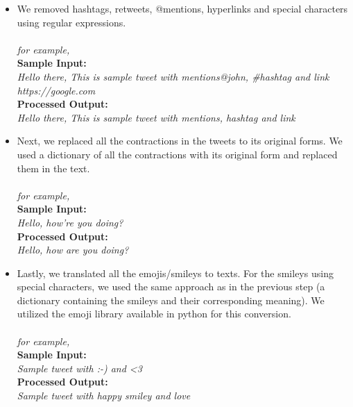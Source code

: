 \documentclass[a4paper,10pt]{article}
\begin{document}
    \begin{itemize}
        \item{
            We removed hashtags, retweets, @mentions, hyperlinks and special characters using regular expressions.
            \\ \\
            \textit{for example, \\  }
            {\textbf{Sample Input: \\} \textit{ Hello there, This is sample tweet with mentions@john, \#hashtag and link https://google.com} \\ }
            {\textbf{Processed Output: \\}\textit{  Hello there, This is sample tweet with mentions, hashtag and link \\ } }
        }
        \item{
            Next, we replaced all the contractions in the tweets to its original forms. We used a dictionary of all the contractions with its original form and replaced them in the text.
            \\ \\
            \textit{for example, \\  }
            {\textbf{Sample Input: \\} \textit{Hello, how're you doing?} \\ }
            {\textbf{Processed Output: \\}\textit{   Hello, how are you doing? \\ } }
        }
        \item{
            Lastly, we translated all the emojis/smileys to texts. For the smileys using special characters, we used the same approach as in the previous step (a dictionary containing the smileys and their corresponding meaning). We utilized the emoji library available in python for this conversion.
            \\ \\
            \textit{for example, \\  }
            {\textbf{Sample Input: \\} \textit{ Sample tweet with :-) and \textless3 } \\ }
            {\textbf{Processed Output: \\}\textit{   Sample tweet with happy smiley and love \\} }
        }\end{itemize}
\end{document}
